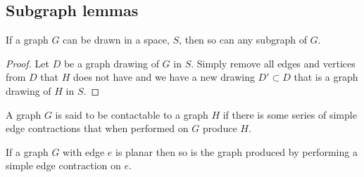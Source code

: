 \documentclass{article}
\begin{document}
\subsection{Subgraph lemmas}

\begin{lemma} \label{subgraph}
	If a graph $G$ can be drawn in a space, $S$, then so can any subgraph of $G$.
\end{lemma}

\begin{proof}
	Let $D$ be a graph drawing of $G$ in $S$. Simply remove all edges and vertices from $D$ that $H$ does not have and we have a new drawing $D'\subset D$ that is a graph drawing of $H$ in $S$.
\end{proof}

\begin{definition}[contactable]
	A graph $G$ is said to be contactable to a graph $H$ if there is some series of simple edge contractions that when performed on $G$ produce $H$.
\end{definition}

\begin{lemma}
	If a graph $G$ with edge $e$ is planar then so is the graph produced by performing a simple edge contraction on $e$.
\end{lemma}
\end{document}
